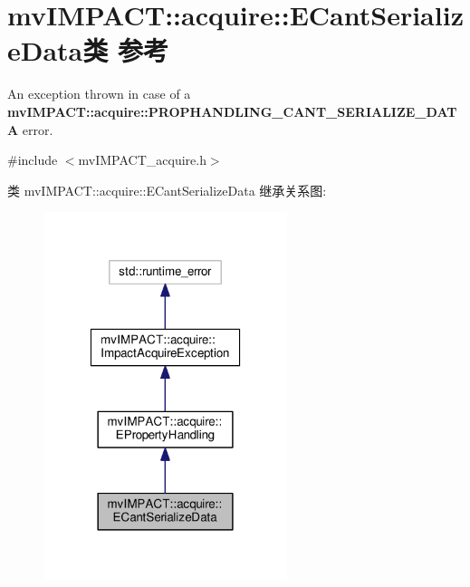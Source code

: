 \hypertarget{classmv_i_m_p_a_c_t_1_1acquire_1_1_e_cant_serialize_data}{\section{mv\+I\+M\+P\+A\+C\+T\+:\+:acquire\+:\+:E\+Cant\+Serialize\+Data类 参考}
\label{classmv_i_m_p_a_c_t_1_1acquire_1_1_e_cant_serialize_data}
}


An exception thrown in case of a {\bfseries mv\+I\+M\+P\+A\+C\+T\+::acquire\+::\+P\+R\+O\+P\+H\+A\+N\+D\+L\+I\+N\+G\+\_\+\+C\+A\+N\+T\+\_\+\+S\+E\+R\+I\+A\+L\+I\+Z\+E\+\_\+\+D\+A\+T\+A} error.  




{\ttfamily \#include $<$mv\+I\+M\+P\+A\+C\+T\+\_\+acquire.\+h$>$}



类 mv\+I\+M\+P\+A\+C\+T\+:\+:acquire\+:\+:E\+Cant\+Serialize\+Data 继承关系图\+:
\nopagebreak
\begin{figure}[H]
\begin{center}
\leavevmode
\includegraphics[width=202pt]{classmv_i_m_p_a_c_t_1_1acquire_1_1_e_cant_serialize_data__inherit__graph}
\end{center}
\end{figure}


